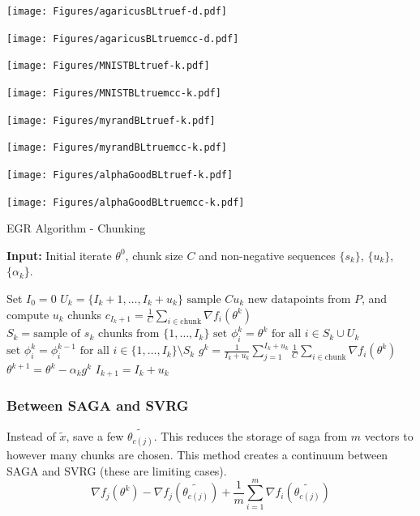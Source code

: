 \documentclass[11pt]{article}
\begin{document}
\texttt{[image: Figures/agaricusBLtruef-d.pdf]}

\texttt{[image: Figures/agaricusBLtruemcc-d.pdf]}


\newpage

\texttt{[image: Figures/MNISTBLtruef-k.pdf]}

\texttt{[image: Figures/MNISTBLtruemcc-k.pdf]}

\texttt{[image: Figures/myrandBLtruef-k.pdf]}

\texttt{[image: Figures/myrandBLtruemcc-k.pdf]}

\texttt{[image: Figures/alphaGoodBLtruef-k.pdf]}

\texttt{[image: Figures/alphaGoodBLtruemcc-k.pdf]}

\newpage


\begin{algorithm}
	[H] 
	\caption{EGR Algorithm - Chunking}
	\label{alg:egr-chunking}
	{\bf Input:} Initial iterate $\theta^0$, chunk size $C$ and non-negative sequences $\{ s_k\} $, $\{ u_k \}$, $\{ \alpha_k \}$.
	\begin{algorithmic}
		[1] 
		\State Set $I_0 = 0$ 
		\State $U_k =\{I_k+1,\ldots, I_k+u_k \}$  
		\State $\mbox{sample } C u_k \mbox{ new datapoints from } P $, and compute $u_k$ chunks $c_{I_k+1} = \frac{1}{C} \sum_{i \in \mbox{chunk}}  \nabla f_{i}(\theta^k)$ 
		\State $S_k = \mbox{sample of } s_k \mbox{ chunks from }\{ 1, \ldots ,I_k\}$ 
		\State $\mbox{set } \phi_i^k = \theta^k \mbox{ for all } i \in S_k\cup U_k$ 
		\State $\mbox{set }\phi_i^k=\phi_i^{k-1}\mbox{ for all } i \in \{ 1, \ldots ,I_k \} \setminus S_k$ 
		\State $g^k = \frac{1}{I_k+u_k} \sum_{j =1}^{I_k+u_k}\frac{1}{C} \sum_{i \in \mbox{chunk}}  \nabla f_{i}(\theta^k)$ 
		\State $\theta^{k+1} = \theta^k - \alpha_k g^k$ 
		\State $I_{k+1} = I_{k} +u_k$ 
		\EndLoop 
	\end{algorithmic}
\end{algorithm}


\subsubsection{Between SAGA and SVRG}
Instead of $\tilde{x}$, save a few $\tilde{\theta_{c(j)}}$. This reduces the storage of saga from $m$ vectors to however many chunks are chosen.
This method creates a continuum between SAGA and SVRG (these are limiting cases). 
\[ \nabla f_j(\theta^k) -  \nabla f_j(\tilde{\theta_{c(j)}}) + \frac{1}{m}\sum_{i=1}^{m}  \nabla f_i (\tilde{\theta_{c(j)}})\]
\end{document}
